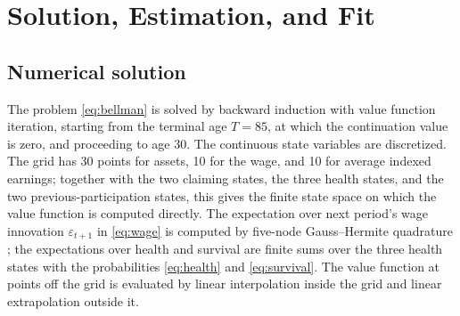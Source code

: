 \section{Solution, Estimation, and Fit}\label{app:estimation}

\subsection{Numerical solution}\label{app:solution}

The problem \eqref{eq:bellman} is solved by backward induction with value function iteration, starting from the terminal age $T=85$, at which the continuation value is zero, and proceeding to age 30. %
The continuous state variables are discretized. The grid has 30 points for assets, 10 for the wage, and 10 for average indexed earnings; together with the two claiming states, the three health states, and the two previous-participation states, this gives the finite state space on which the value function is computed directly. %
The expectation over next period's wage innovation $\varepsilon_{t+1}$ in \eqref{eq:wage} is computed by five-node Gauss--Hermite quadrature \citep{Judd1998}; the expectations over health and survival are finite sums over the three health states with the probabilities \eqref{eq:health} and \eqref{eq:survival}. %
The value function at points off the grid is evaluated by linear interpolation inside the grid and linear extrapolation outside it. %

